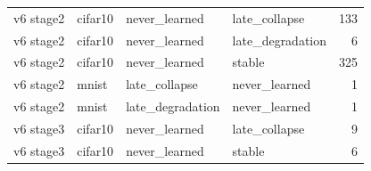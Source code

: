 \begin{table}[htbp]
{\begin{tabular}{@{}llllr@{}}
v6 stage2 & cifar10 & never\_learned & late\_collapse & 133 \\
v6 stage2 & cifar10 & never\_learned & late\_degradation & 6 \\
v6 stage2 & cifar10 & never\_learned & stable & 325 \\
v6 stage2 & mnist & late\_collapse & never\_learned & 1 \\
v6 stage2 & mnist & late\_degradation & never\_learned & 1 \\
v6 stage3 & cifar10 & never\_learned & late\_collapse & 9 \\
v6 stage3 & cifar10 & never\_learned & stable & 6 \\
\bottomrule
\end{tabular}}
\end{table}
